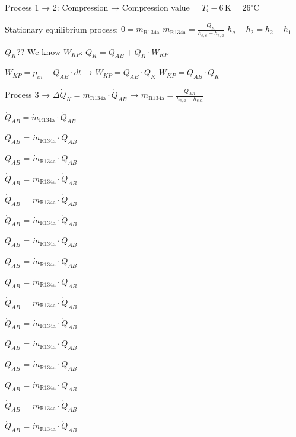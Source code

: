 Process 1 → 2: Compression → Compression value = \( T_i - 6 \, \text{K} = 26^\circ \text{C} \)  

Stationary equilibrium process: \( 0 = \dot{m}_{\text{R134a}} \)  
\( \dot{m}_{\text{R134a}} = \frac{\dot{Q}_K}{h_{e,c} - h_{e,a}} \)  
\( h_a - h_2 = h_2 - h_1 \)  

\( \dot{Q}_K?? \) We know \( W_{KP} \):  
\( \dot{Q}_K = \dot{Q}_{AB} + \dot{Q}_K \cdot W_{KP} \)  

\( W_{KP} = p_{in} - Q_{AB} \cdot dt \) → \( \dot{W}_{KP} = \dot{Q}_{AB} \cdot \dot{Q}_K \)  
\( \dot{W}_{KP} = \dot{Q}_{AB} \cdot \dot{Q}_K \)  

Process 3 → \( \Delta \dot{Q}_K = \dot{m}_{\text{R134a}} \cdot \dot{Q}_{AB} \) → \( \dot{m}_{\text{R134a}} = \frac{\dot{Q}_{AB}}{h_{e,a} - h_{e,a}} \)  

\( \dot{Q}_{AB} = \dot{m}_{\text{R134a}} \cdot \dot{Q}_{AB} \)  

\( \dot{Q}_{AB} \) = \( \dot{m}_{\text{R134a}} \cdot \dot{Q}_{AB} \)  

\( \dot{Q}_{AB} \) = \( \dot{m}_{\text{R134a}} \cdot \dot{Q}_{AB} \)  

\( \dot{Q}_{AB} \) = \( \dot{m}_{\text{R134a}} \cdot \dot{Q}_{AB} \)  

\( \dot{Q}_{AB} \) = \( \dot{m}_{\text{R134a}} \cdot \dot{Q}_{AB} \)  

\( \dot{Q}_{AB} \) = \( \dot{m}_{\text{R134a}} \cdot \dot{Q}_{AB} \)  

\( \dot{Q}_{AB} \) = \( \dot{m}_{\text{R134a}} \cdot \dot{Q}_{AB} \)  

\( \dot{Q}_{AB} \) = \( \dot{m}_{\text{R134a}} \cdot \dot{Q}_{AB} \)  

\( \dot{Q}_{AB} \) = \( \dot{m}_{\text{R134a}} \cdot \dot{Q}_{AB} \)  

\( \dot{Q}_{AB} \) = \( \dot{m}_{\text{R134a}} \cdot \dot{Q}_{AB} \)  

\( \dot{Q}_{AB} \) = \( \dot{m}_{\text{R134a}} \cdot \dot{Q}_{AB} \)  

\( \dot{Q}_{AB} \) = \( \dot{m}_{\text{R134a}} \cdot \dot{Q}_{AB} \)  

\( \dot{Q}_{AB} \) = \( \dot{m}_{\text{R134a}} \cdot \dot{Q}_{AB} \)  

\( \dot{Q}_{AB} \) = \( \dot{m}_{\text{R134a}} \cdot \dot{Q}_{AB} \)  

\( \dot{Q}_{AB} \) = \( \dot{m}_{\text{R134a}} \cdot \dot{Q}_{AB} \)  

\( \dot{Q}_{AB} \) = \( \dot{m}_{\text{R134a}} \cdot \dot{Q}_{AB} \)  


